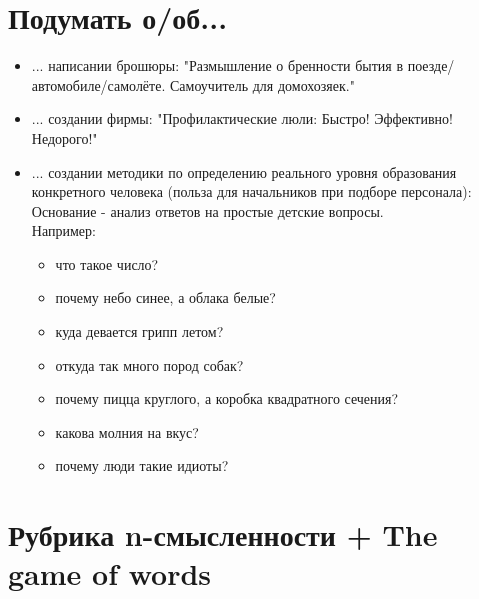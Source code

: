 \documentclass{ideas}
\begin{document}
\section*{Подумать о/об...}
\begin{itemize}
\item ... написании брошюры: "Размышление о бренности бытия в поезде/автомобиле/самолёте. Самоучитель для домохозяек."
\item ... создании фирмы: "Профилактические люли: Быстро! Эффективно! Недорого!"
\item ...  создании методики по определению реального уровня образования конкретного человека (польза для начальников при подборе персонала):\\

Основание - анализ ответов на простые детские вопросы.\\
Например:\\
    \begin{itemize}
        \item что такое число?\\
        \item почему небо синее, а облака белые?\\
        \item куда девается грипп летом?\\
        \item откуда так много пород собак?\\
        \item почему пицца круглого, а коробка квадратного сечения?\\
        \item какова молния на вкус?\\
        \item почему люди такие идиоты?
    \end{itemize}
\end{itemize}
\newpage
\section*{Рубрика n-смысленности + The game of words}
\end{document}
